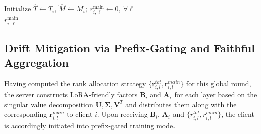 \documentclass{article}
\begin{document}
\begin{algorithm}[tb]
\caption{Water-Filling for Train-side Prefix Rank Allocation}
\label{alg:rmain_waterfill}

Initialize $\widehat T \gets T_i$, $\widehat M \gets M_i$; \quad $r^{\mathrm{main}}_{i,\ell}\gets 0,\ \forall \ell$ \\
\Return $r^{\mathrm{main}}_{i,\ell}$
\end{algorithm}

\subsection{Drift Mitigation via Prefix-Gating and Faithful Aggregation}
Having computed the rank allocation strategy $\{\mathbf{r}_{i, l}^{tot}, \mathbf{r}_{i, l}^{main}\}$ for this global round, the server constructs LoRA-friendly factors $\mathbf{B}_{i}$ and $\mathbf{A}_{i}$ for each layer based on the singular value decomposition $\mathbf{U},\mathbf{\Sigma},\mathbf{V}^{T}$ and distributes them along with the corresponding $\mathbf{r}_{i, l}^{main}$ to client $i$. Upon receiving $\mathbf{B}_{i}$, $\mathbf{A}_{i}$ and $\{r_{i, l}^{tot}, r_{i, l}^{main}\}$, the client is accordingly initiated into prefix-gated training mode.
\end{document}
